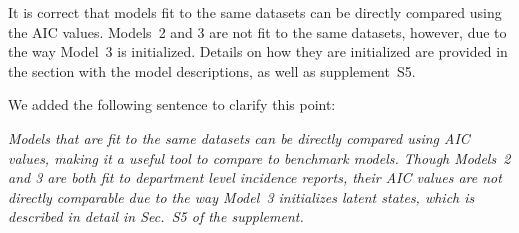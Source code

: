 \documentclass[11pt]{article}
\newcommand\article[1]{{\color{blue} \vspace{1mm}\hspace{0.25in}\parbox{6in}{\em #1}}}
\begin{document}
It is correct that models fit to the same datasets can be directly compared using the AIC values. Models~2 and 3 are not fit to the same datasets, however, due to the way Model~3 is initialized.
Details on how they are initialized are provided in the section with the model descriptions, as well as supplement~S5.


We added the following sentence to clarify this point:

\article{Models that are fit to the same datasets can be directly compared using AIC values, making it a useful tool to compare to benchmark models. Though Models~2 and 3 are both fit to department level incidence reports, their AIC values are not directly comparable due to the way Model~3 initializes latent states, which is described in detail in Sec.~S5 of the supplement.}
\end{document}
